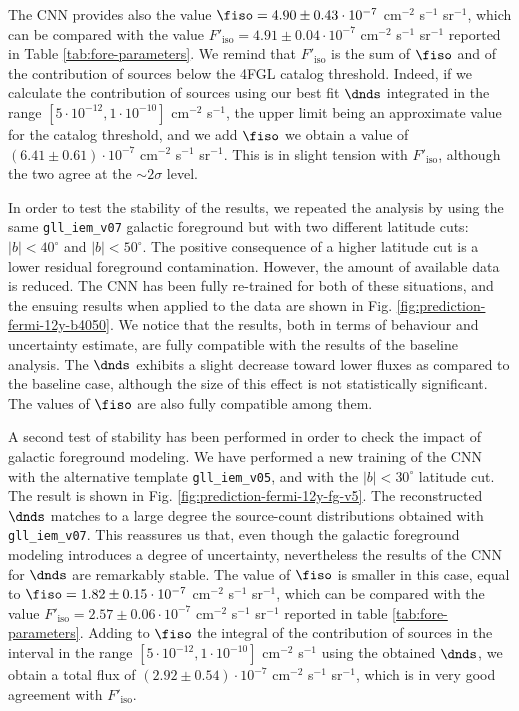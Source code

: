 The CNN provides also the value $\fiso=4.90 \pm 0.43 \cdot 10^{-7}$ cm$^{-2}$ s$^{-1}$ sr$^{-1}$, 
which can be compared with the value $F'_\textrm{iso}=4.91 \pm 0.04 \cdot 10^{-7}$ cm$^{-2}$ s$^{-1}$ sr$^{-1}$ reported in Table \ref{tab:fore-parameters}.
We remind that $F'_\textrm{iso}$ is the sum of $\fiso$ and of the contribution of sources below the 4FGL catalog threshold. Indeed, if we  calculate the contribution of sources using our best fit $\dnds$ integrated in the range $[5 \cdot 10^{-12}, 1 \cdot 10^{-10}]$ cm$^{-2}$ s$^{-1}$, the upper limit being an approximate value for the catalog threshold, and we add $\fiso$  we obtain a value of {$(6.41 \pm 0.61)\cdot 10^{-7}$ cm$^{-2}$ s$^{-1}$} sr$^{-1}$.
This is in slight tension with $F'_\textrm{iso}$, although the two agree at the $\sim 2\sigma$ level.


In order to test the stability of the results, we repeated the analysis by using the same \verb|gll_iem_v07| galactic foreground but with two different latitude cuts: $|b|<40^\circ$ and $|b|<50^\circ$. The positive consequence of a higher latitude cut is a lower residual foreground contamination. However, the amount of available data is reduced. The CNN has been fully re-trained for both of these situations, and the ensuing results when applied to the \fermi data are shown in Fig. \ref{fig:prediction-fermi-12y-b4050}. We notice that the results, both in terms of behaviour and uncertainty estimate, are fully compatible with the results of the baseline analysis. The $\dnds$ exhibits a slight decrease toward lower fluxes as compared to the baseline case, although the size of this effect is not statistically significant. The values of $\fiso$ are also fully compatible among them.

A second test of stability has been performed in order to check the impact of galactic foreground modeling. We have performed a new training of the CNN with the alternative template \verb|gll_iem_v05|, and with the $|b|<30^\circ$ latitude cut. The result is shown in Fig. \ref{fig:prediction-fermi-12y-fg-v5}. The reconstructed $\dnds$ matches to a large degree the source-count distributions obtained with \verb|gll_iem_v07|. This reassures us that, even though the galactic foreground modeling introduces a degree of uncertainty, nevertheless the results of the CNN for $\dnds$ are remarkably stable.
The value of $\fiso$ is smaller in this case, equal to
$\fiso=1.82 \pm 0.15 \cdot 10^{-7}$ cm$^{-2}$ s$^{-1}$ sr$^{-1}$, 
which can be compared with the value $F'_\textrm{iso}=2.57 \pm 0.06 \cdot 10^{-7}$ cm$^{-2}$ s$^{-1}$ sr$^{-1}$ reported in table \ref{tab:fore-parameters}.
Adding to $\fiso$ the integral of the contribution of sources in the interval in the range $[5 \cdot 10^{-12}, 1 \cdot 10^{-10}]$ cm$^{-2}$ s$^{-1}$ using the obtained $\dnds$, we obtain a total flux of { $(2.92 \pm 0.54)\cdot 10^{-7}$ cm$^{-2}$ s$^{-1}$} sr$^{-1}$, which is in very good agreement with $F'_\textrm{iso}$. 






